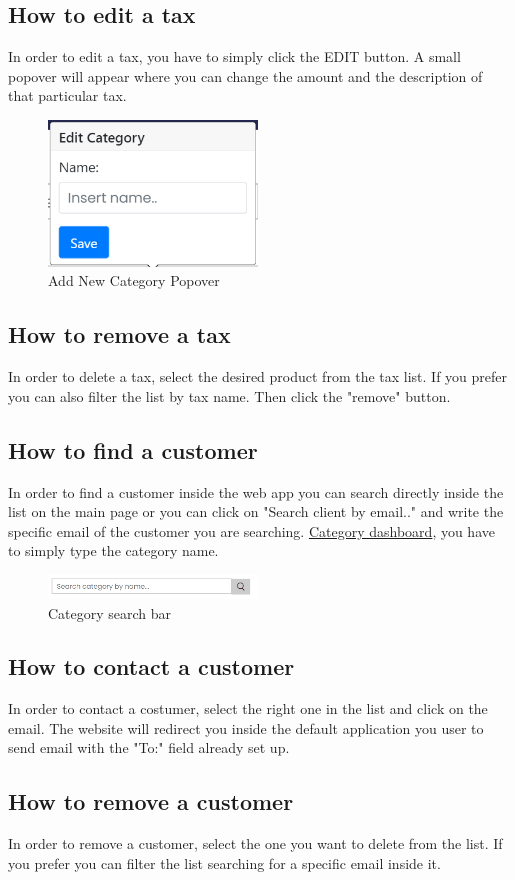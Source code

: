 \subsection{How to edit a tax}\label{_editTax}
In order to edit a tax, you have to simply click the EDIT button.
A small popover will appear where you can change the amount and the description of that particular tax.
\begin{figure}[H]    \includegraphics[width=15em]{res/images/venditore/editcategorypopover.png}

    \centering
    \caption{Add New Category Popover}
\end{figure}

\subsection{How to remove a tax}\label{_removeTax}
In order to delete a tax, select the desired product from the tax list. If you prefer you can also filter the list by tax name. Then click the "remove" button.

\subsection{How to find a customer}\label{_findCustomer}
In order to find a customer inside the web app you can search directly inside the list on the main page or you can click on "Search client by email.." and write the specific email of the customer you are searching. \hyperref[_categorymanagement]{Category dashboard}, you have to simply type the category name.
\begin{figure}[H]
    \centering
    \includegraphics[width=15em]{res/images/venditore/categorysearchbar.png}
    \caption{Category search bar}
\end{figure}

\subsection{How to contact a customer}\label{_contactCustomer}
In order to contact a costumer, select the right one in the list and click on the email. The website will redirect you inside the default application you user to send email with the "To:" field already set up.


\subsection{How to remove a customer}\label{_removeCustomer}
In order to remove a customer, select the one you want to delete from the list. If you prefer you can filter the list searching for a specific email inside it.
